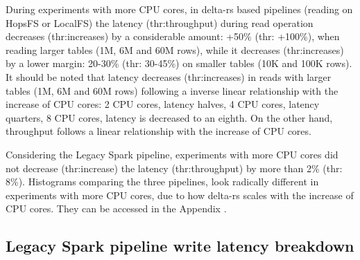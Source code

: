 During experiments with more \gls{CPU} cores, in delta-rs based pipelines (reading on \gls{HopsFS} or \gls{LocalFS}) the latency (thr:throughput) during read operation decreases (thr:increases) by a considerable amount: +50\% (thr: +100\%), when reading larger tables (1M, 6M and 60M rows), while it decreases (thr:increases) by a lower margin: 20-30\% (thr: 30-45\%) on smaller tables (10K and 100K rows). It should be noted that latency decreases (thr:increases) in reads with larger tables (1M, 6M and 60M rows) following a inverse linear relationship with the increase of \gls{CPU} cores: 2 \gls{CPU} cores, latency halves, 4 \gls{CPU} cores, latency quarters, 8 \gls{CPU} cores, latency is decreased to an eighth. On the other hand, throughput follows a linear relationship with the increase of \gls{CPU} cores.

Considering the Legacy Spark pipeline, experiments with more \gls{CPU} cores did not decrease (thr:increase) the latency (thr:throughput) by more than 2\% (thr: 8\%). Histograms comparing the three pipelines, look radically different in experiments with more \gls{CPU} cores, due to how delta-rs scales with the increase of \gls{CPU} cores. They can be accessed in the Appendix .

\subsection{Legacy Spark pipeline write latency breakdown}


